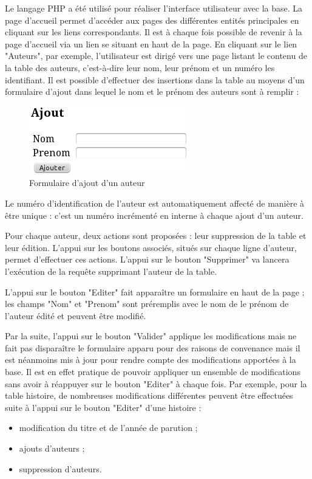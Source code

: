 \documentclass[12pt]{article}
\begin{document}
Le langage PHP a été utilisé pour réaliser l'interface utilisateur avec la
base. La page d'accueil permet d'accéder aux pages des différentes entités
principales en cliquant sur les liens correspondants. Il est à chaque fois
possible de revenir à la page d'accueil via un lien se situant en haut de la
page. En cliquant sur le lien "Auteurs", par exemple, l'utilisateur est dirigé
vers une page listant le contenu de la table des auteurs, c'est-à-dire leur
nom, leur prénom et un numéro les identifiant. Il est possible d'effectuer des
insertions dans la table au moyens d'un formulaire d'ajout dans lequel le nom
et le prénom des auteurs sont à remplir :

\begin{figure}[h!]
\begin{center}
\noindent\includegraphics[]{formulaire-ajout-auteur}
  \caption{Formulaire d'ajout d'un auteur}
\end{center}
\end{figure}

Le numéro d'identification de l'auteur est automatiquement affecté de manière
à être unique : c'est un numéro incrémenté en interne à chaque ajout d'un
auteur.

Pour chaque auteur, deux actions sont proposées : leur suppression de la table
et leur édition. L'appui sur les boutons associés, situés sur chaque ligne
d'auteur, permet d'effectuer ces actions. L'appui sur le bouton "Supprimer" va
lancera l'exécution de la requête supprimant l'auteur de la table.

L'appui sur le bouton "Editer" fait apparaître un formulaire en haut de la
page ; les champs "Nom" et "Prenom" sont préremplis avec le nom de le prénom
de l'auteur édité et peuvent être modifié.

Par la suite, l'appui sur le bouton "Valider" applique les modifications mais
ne fait pas disparaître le formulaire apparu pour des raisons de convenance
mais il est néanmoins mis à jour pour rendre compte des modifications
apportées à la base.
Il est en effet pratique de pouvoir appliquer un ensemble de modifications
sans avoir à réappuyer sur le bouton "Editer" à chaque fois.
Par exemple, pour la table histoire, de nombreuses modifications différentes
peuvent être effectuées suite à l'appui sur le bouton "Editer" d'une histoire
: 
\begin{itemize}
	\item modification du titre et de l'année de parution ;
	\item ajouts d'auteurs ;
	\item suppression d'auteurs.
\end{itemize}
\end{document}

